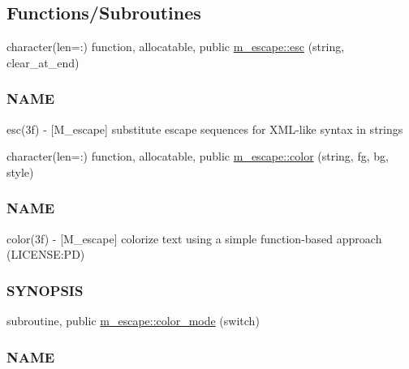 \subsection*{Functions/\+Subroutines}
\begin{DoxyCompactItemize}
\item 
character(len=\+:) function, allocatable, public \mbox{\hyperlink{namespacem__escape_a36f016baad6b23f86189e6f3ee6db0cb}{m\+\_\+escape\+::esc}} (string, clear\+\_\+at\+\_\+end)
\begin{DoxyCompactList}\small\item\em \subsubsection*{N\+A\+ME}

esc(3f) -\/ \mbox{[}M\+\_\+escape\mbox{]} substitute escape sequences for X\+M\+L-\/like syntax in strings \end{DoxyCompactList}\item 
character(len=\+:) function, allocatable, public \mbox{\hyperlink{namespacem__escape_af7d28a73e65efb58beeb684d7bdeefec}{m\+\_\+escape\+::color}} (string, fg, bg, style)
\begin{DoxyCompactList}\small\item\em \subsubsection*{N\+A\+ME}

color(3f) -\/ \mbox{[}M\+\_\+escape\mbox{]} colorize text using a simple function-\/based approach (L\+I\+C\+E\+N\+SE\+:PD) \subsubsection*{S\+Y\+N\+O\+P\+S\+IS}\end{DoxyCompactList}\item 
subroutine, public \mbox{\hyperlink{namespacem__escape_a24566737cb6aa1672180eaa21c8d4f66}{m\+\_\+escape\+::color\+\_\+mode}} (switch)
\begin{DoxyCompactList}\small\item\em \subsubsection*{N\+A\+ME}


\end{DoxyCompactList}
\end{DoxyCompactItemize}
